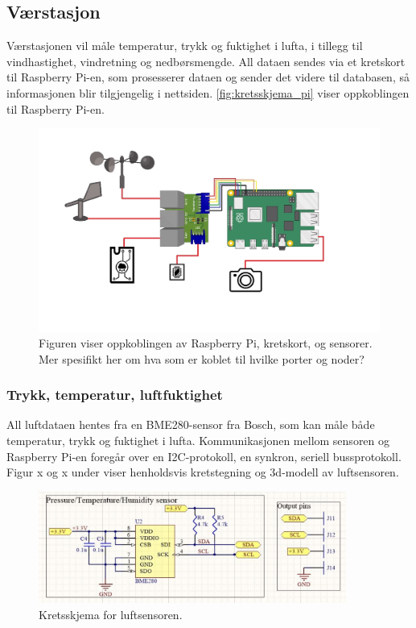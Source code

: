 \subsection{Værstasjon}

Værstasjonen vil måle temperatur, trykk og fuktighet i lufta, i tillegg til vindhastighet, vindretning og nedbørsmengde. All dataen sendes via et kretskort til Raspberry Pi-en, som prosesserer dataen og sender det videre til databasen, så informasjonen blir tilgjengelig i nettsiden. \autoref{fig:kretsskjema_pi} viser oppkoblingen til Raspberry Pi-en.

\begin{figure}[H]
    \centering
    \includegraphics[width=\textwidth]{implementering/kretsskjema_pi.png}
    \caption{Figuren viser oppkoblingen av Raspberry Pi, kretskort, og sensorer. Mer spesifikt her om hva som er koblet til hvilke porter og noder?}
    \label{fig:kretsskjema_pi}
\end{figure}

\subsubsection{Trykk, temperatur, luftfuktighet}

All luftdataen hentes fra en BME280-sensor fra Bosch, som kan måle både temperatur, trykk og fuktighet i lufta. Kommunikasjonen mellom sensoren og Raspberry Pi-en foregår over en I2C-protokoll, en synkron, seriell bussprotokoll. Figur x og x under viser henholdsvis kretstegning og 3d-modell av luftsensoren.

\begin{figure}[H]
    \centering
    \includegraphics[width=0.9\textwidth]{implementering/luftsensor_krets.png}
    \caption{Kretsskjema for luftsensoren.}
    \label{fig:luftsensor_krets-}
\end{figure}

